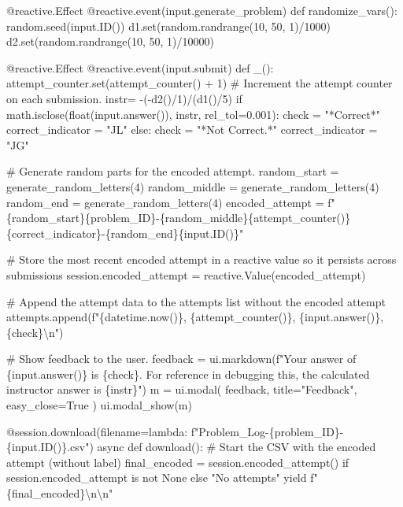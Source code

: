 \documentclass[
  letterpaper,
  DIV=11,
  numbers=noendperiod]{scrreprt}
\newenvironment{Shaded}{\begin{snugshade}}{\end{snugshade}}
\newcommand{\NormalTok}[1]{\textcolor[rgb]{0.00,0.23,0.31}{#1}}
\begin{document}
\begin{Shaded}
\begin{Highlighting}[]
\NormalTok{    @reactive.Effect}
\NormalTok{    @reactive.event(input.generate\_problem)}
\NormalTok{    def randomize\_vars():}
\NormalTok{        random.seed(input.ID())}
\NormalTok{        d1.set(random.randrange(10, 50, 1)/1000)}
\NormalTok{        d2.set(random.randrange(10, 50, 1)/10000)}
        
\NormalTok{    @reactive.Effect}
\NormalTok{    @reactive.event(input.submit)}
\NormalTok{    def \_():}
\NormalTok{        attempt\_counter.set(attempt\_counter() + 1)  \# Increment the attempt counter on each submission.}
\NormalTok{        instr= {-}({-}d2()/1)/(d1()/5)}
\NormalTok{        if math.isclose(float(input.answer()), instr, rel\_tol=0.001):}
\NormalTok{            check = "*Correct*"}
\NormalTok{            correct\_indicator = "JL"}
\NormalTok{        else:}
\NormalTok{            check = "*Not Correct.*"}
\NormalTok{            correct\_indicator = "JG"}

\NormalTok{        \# Generate random parts for the encoded attempt.}
\NormalTok{        random\_start = generate\_random\_letters(4)}
\NormalTok{        random\_middle = generate\_random\_letters(4)}
\NormalTok{        random\_end = generate\_random\_letters(4)}
\NormalTok{        encoded\_attempt = f"\{random\_start\}\{problem\_ID\}{-}\{random\_middle\}\{attempt\_counter()\}\{correct\_indicator\}{-}\{random\_end\}\{input.ID()\}"}

\NormalTok{        \# Store the most recent encoded attempt in a reactive value so it persists across submissions}
\NormalTok{        session.encoded\_attempt = reactive.Value(encoded\_attempt)}

\NormalTok{        \# Append the attempt data to the attempts list without the encoded attempt}
\NormalTok{        attempts.append(f"\{datetime.now()\}, \{attempt\_counter()\}, \{input.answer()\}, \{check\}\textbackslash{}n")}

\NormalTok{        \# Show feedback to the user.}
\NormalTok{        feedback = ui.markdown(f"Your answer of \{input.answer()\} is \{check\}. For reference in debugging this, the calculated instructor answer is \{instr\}")}
\NormalTok{        m = ui.modal(}
\NormalTok{            feedback,}
\NormalTok{            title="Feedback",}
\NormalTok{            easy\_close=True}
\NormalTok{        )}
\NormalTok{        ui.modal\_show(m)}

\NormalTok{    @session.download(filename=lambda: f"Problem\_Log{-}\{problem\_ID\}{-}\{input.ID()\}.csv")}
\NormalTok{    async def download():}
\NormalTok{        \# Start the CSV with the encoded attempt (without label)}
\NormalTok{        final\_encoded = session.encoded\_attempt() if session.encoded\_attempt is not None else "No attempts"}
\NormalTok{        yield f"\{final\_encoded\}\textbackslash{}n\textbackslash{}n"}
        

\end{Highlighting}
\end{Shaded}
\end{document}
